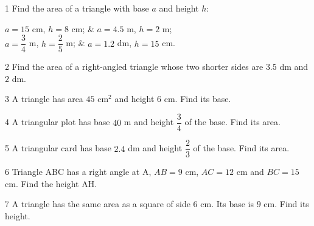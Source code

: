 \begin{probbox}{1}{\relax}
Find the area of a triangle with base $a$ and height $h$:
\begin{cols2}
 $a=15$ cm, $h=8$ cm; &  $a=4.5$ m, $h=2$ m;\\
 $a=\dfrac34$ m, $h=\dfrac25$ m; &  $a=1.2$ dm, $h=15$ cm.
\end{cols2}
\end{probbox}
\gap
\begin{probbox}{2}{\relax}
Find the area of a right-angled triangle whose two shorter sides are $3.5$ dm and $2$ dm.
\end{probbox}
\gap
\begin{probbox}{3}{\relax}
A triangle has area $45$ cm$^2$ and height $6$ cm. Find its base.
\end{probbox}
\gap
\begin{probbox}{4}{\relax}
A triangular plot has base $40$ m and height $\dfrac34$ of the base. Find its area.
\end{probbox}
\gap
\begin{probbox}{5}{\relax}
A triangular card has base $2.4$ dm and height $\dfrac23$ of the base. Find its area.
\end{probbox}
\gap
\begin{probbox}{6}{\relax}
Triangle ABC has a right angle at A, $AB=9$ cm, $AC=12$ cm and $BC=15$ cm. Find the height AH.
\end{probbox}
\gap
\begin{probbox}{7}{\relax}
A triangle has the same area as a square of side $6$ cm. Its base is $9$ cm. Find its height.
\end{probbox}
